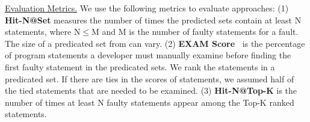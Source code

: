 \underline{Evaluation Metrics.}  
We use the following metrics to evaluate approaches: 
(1) {\bf Hit-N@Set} measures the number of times the predicted sets contain at least N statements, where N$\le$M and M is the number of faulty statements for a fault. The size of a predicated set from {\tool} can vary. %
(2) {\bf EXAM Score~\cite{wong2008crosstab}} is the percentage of program statements a developer must manually examine before finding the first faulty statement in the predicated sets. We rank the statements in a predicated set. If there are ties in the scores of statements, we assumed half of the tied statements that are needed to be examined. 
(3) {\bf Hit-N@Top-K} is the number of times at least N faulty statements appear among the Top-K ranked statements. %




